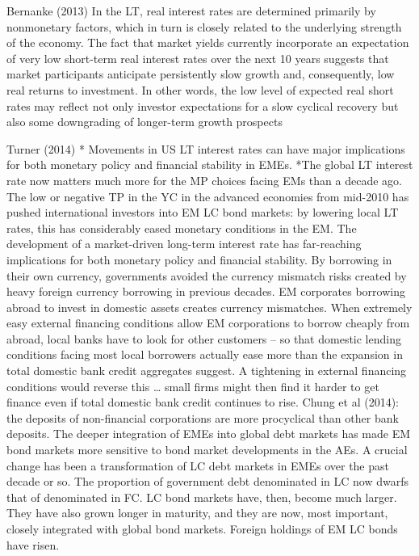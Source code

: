 Bernanke (2013)
In the LT, real interest rates are determined primarily by nonmonetary factors, which in turn is closely related to the underlying strength of the economy. The fact that market yields currently incorporate an expectation of very low short-term real interest rates over the next 10 years suggests that market participants anticipate persistently slow growth and, consequently, low real returns to investment. In other words, the low level of expected real short rates may reflect not only investor expectations for a slow cyclical recovery but also some downgrading of longer-term growth prospects

Turner (2014)
* Movements in US LT interest rates can have major implications for both monetary policy and financial stability in EMEs.
*The global LT interest rate now matters much more for the MP choices facing EMs than a decade ago. The low or negative TP in the YC in the advanced economies from mid-2010 has pushed international investors into EM LC bond markets: by lowering local LT rates, this has considerably eased monetary conditions in the EM.
The development of a market-driven long-term interest rate has far-reaching implications for both monetary policy and financial stability. 
By borrowing in their own currency, governments avoided the currency mismatch risks created by heavy foreign currency borrowing in previous decades. 
EM corporates borrowing abroad to invest in domestic assets creates currency mismatches.
When extremely easy external financing conditions allow  EM corporations to borrow cheaply from abroad, local banks have to look for other customers – so that domestic lending conditions facing most local borrowers actually ease more than the expansion in total domestic bank credit aggregates suggest. A tightening in external financing conditions would reverse this … small firms might then find it harder to get finance
even if total domestic bank credit continues to rise. 
Chung et al (2014): the deposits of non-financial corporations are more procyclical than other bank deposits.
The deeper integration of EMEs into global debt markets has made EM bond
markets more sensitive to bond market developments in the AEs. A crucial change has been a transformation of LC debt markets in EMEs over the past decade or so. The proportion of government debt denominated in LC now dwarfs that of denominated in FC.
LC bond markets have, then, become much larger. They have also grown longer in maturity, and they are now, most important, closely integrated with
global bond markets. Foreign holdings of EM LC bonds have risen.
